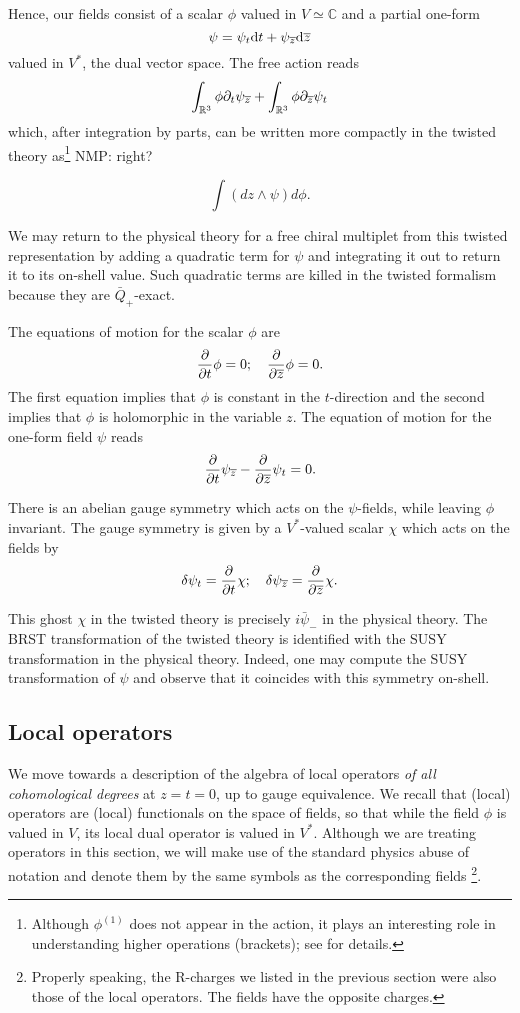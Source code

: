 \documentclass[11pt]{amsart}
\def\natalie#1{{\textcolor{green!65!black}{NMP: {#1}}}}
\begin{document}
Hence, our fields consist of a scalar $\phi$ valued in $V \simeq \mathbb{C}$ and a partial one-form 
\[
\psi = \psi_t {\rm d} t + \psi_{\overline{z}} {\rm d} {\overline{z}} 
\]
valued in $V^*$, the dual vector space.
The free action reads
\[
\int_{\mathbb R^3} \phi \partial_t \psi_{\overline{z}} + \int_{\mathbb R^3} \phi \partial_{\overline{z}} \psi_t 
\]
which, after integration by parts, can be written more compactly in the twisted theory as\footnote{Although $\phi^{(1)}$ does not appear in the action, it plays an interesting role in understanding higher operations (brackets); see \cite{CDG} for details.} \natalie{right?}

\[
\int(dz \wedge \psi) d\phi.
\]

We may return to the physical theory for a free chiral multiplet from this twisted representation by adding a quadratic term for $\psi$ and integrating it out to return it to its on-shell value. Such quadratic terms are killed in the twisted formalism because they are $\bar{Q}_+$-exact.  

The equations of motion for the scalar $\phi$ are
\[
\frac{\partial}{\partial t} \phi = 0; \quad
\frac{\partial}{\partial {\overline{z}}} \phi = 0 .
\]
The first equation implies that $\phi$ is constant in the $t$-direction and the second implies that $\phi$ is holomorphic in the variable $z$. 
The equation of motion for the one-form field $\psi$ reads
\[
\frac{\partial}{\partial t} \psi_{\overline{z}} - \frac{\partial}{\partial {\overline{z}}} \psi_t = 0 .
\]

There is an abelian gauge symmetry which acts on the $\psi$-fields, while leaving $\phi$ invariant.
The gauge symmetry is given by a $V^*$-valued scalar $\chi$ which acts on the fields by
\begin{equation}\label{eqn:freegauge}
\delta \psi_t = \frac{\partial}{\partial t} \chi; \quad
\delta \psi_{\overline{z}} = \frac{\partial}{\partial {\overline{z}}} \chi .
\end{equation}

This ghost $\chi$ in the twisted theory is precisely $i \bar{\psi}_-$ in the physical theory. The BRST transformation of the twisted theory is identified with the SUSY transformation in the physical theory. Indeed, one may compute the SUSY transformation of $\psi$ and observe that it coincides with this symmetry on-shell. 

\subsection*{Local operators}

We move towards a description of the algebra of local operators \textit{of all cohomological degrees} at $z = t = 0$, up to gauge equivalence. We recall that (local) operators are (local) functionals on the space of fields, so that while the field $\phi$ is valued in $V$, its local dual operator is valued in $V^*$. Although we are treating operators in this section, we will make use of the standard physics abuse of notation and denote them by the same symbols as the corresponding fields \footnote{Properly speaking, the R-charges we listed in the previous section were also those of the local operators. The fields have the opposite charges.}. 
\end{document}
